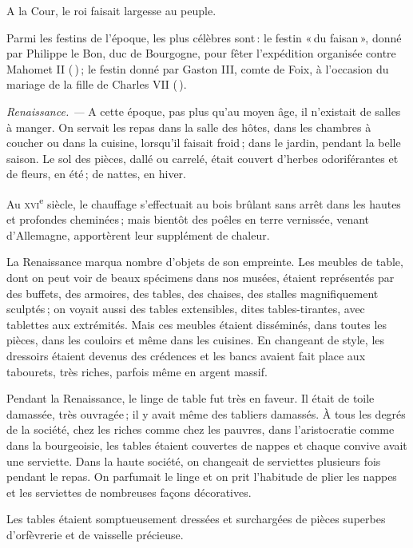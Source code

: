 A la Cour, le roi faisait largesse au peuple.

Parmi les festins de l'époque, les plus célèbres sont : le festin « du
faisan », donné par Philippe le Bon, duc de Bourgogne, pour fêter l'expédition
organisée contre Mahomet II ({\mmm} {\mmm}) ; le festin donné par
Gaston III, comte de Foix, à l'occasion du mariage de la fille de Charles VII
({\mmm} {\mmm}).

\sk

\textit{Renaissance. —} A cette époque, pas plus qu'au moyen âge, il n'existait
de salles à manger. On servait les repas dans la salle des hôtes, dans les
chambres à coucher ou dans la cuisine, lorsqu'il faisait froid ; dans le jardin,
pendant la belle saison. Le sol des pièces, dallé ou carrelé, était couvert
d'herbes odoriférantes et de fleurs, en été ; de nattes, en hiver.

Au \textsc{xvi}\textsuperscript{e} siècle, le chauffage s'effectuait au bois
brûlant sans arrêt dans les hautes et profondes cheminées ; mais bientôt des
poêles en terre vernissée, venant d'Allemagne, apportèrent leur supplément de
chaleur.

La Renaissance marqua nombre d'objets de son empreinte. Les meubles de table,
dont on peut voir de beaux spécimens dans nos musées, étaient représentés par
des buffets, des armoires, des tables, des chaises, des stalles magnifiquement
sculptés ; on voyait aussi des tables extensibles, dites tables-tirantes, avec
tablettes aux extrémités. Mais ces meubles étaient disséminés, dans toutes les
pièces, dans les couloirs et même dans les cuisines. En changeant de style, les
dressoirs étaient devenus des crédences et les bancs avaient fait place aux
tabourets, très riches, parfois même en argent massif.

Pendant la Renaissance, le linge de table fut très en faveur. Il était de toile
damassée, très ouvragée ; il y avait même des tabliers damassés. À tous les
degrés de la société, chez les riches comme chez les pauvres, dans
l'aristocratie comme dans la bourgeoisie, les tables étaient couvertes de
nappes et chaque convive avait une serviette. Dans la haute société, on
changeait de serviettes plusieurs fois pendant le repas. On parfumait le linge
et on prit l'habitude de plier les nappes et les serviettes de nombreuses
façons décoratives.

Les tables étaient somptueusement dressées et surchargées de pièces superbes
d'orfèvrerie et de vaisselle précieuse.

